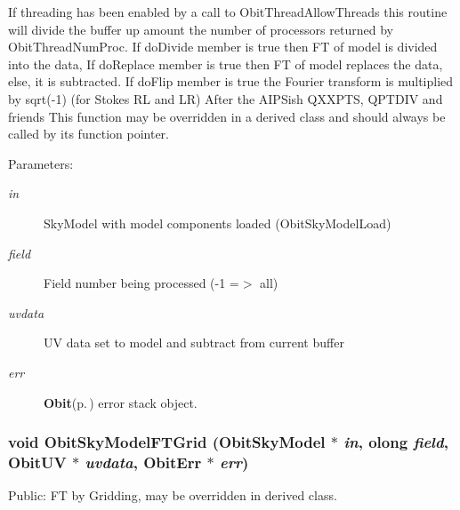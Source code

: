If threading has been enabled by a call to Obit\-Thread\-Allow\-Threads this routine will divide the buffer up amount the number of processors returned by Obit\-Thread\-Num\-Proc. If do\-Divide member is true then FT of model is divided into the data, If do\-Replace member is true then FT of model replaces the data, else, it is subtracted. If do\-Flip member is true the Fourier transform is multiplied by sqrt(-1) (for Stokes RL and LR) After the AIPSish QXXPTS, QPTDIV and friends This function may be overridden in a derived class and should always be called by its function pointer. \begin{Desc}
\item[Parameters:]
\begin{description}
\item[{\em in}]Sky\-Model with model components loaded (Obit\-Sky\-Model\-Load) \item[{\em field}]Field number being processed (-1 =$>$ all) \item[{\em uvdata}]UV data set to model and subtract from current buffer \item[{\em err}]{\bf Obit}{\rm (p.\,\pageref{structObit})} error stack object. \end{description}
\end{Desc}
\subsubsection{\setlength{\rightskip}{0pt plus 5cm}void Obit\-Sky\-Model\-FTGrid ({\bf Obit\-Sky\-Model} $\ast$ {\em in}, {\bf olong} {\em field}, {\bf Obit\-UV} $\ast$ {\em uvdata}, {\bf Obit\-Err} $\ast$ {\em err})}\label{ObitSkyModel_8c_a29}


Public: FT by Gridding, may be overridden in derived class. 

